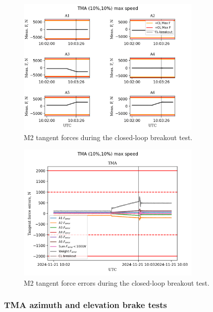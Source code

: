 \begin{figure}
    \centering
    \includegraphics[width=0.8\textwidth]{spa/M2_cl_breakout_10_tangent_forces.png}
    \caption{M2 tangent forces during the closed-loop breakout test.}
    \label{fig:m2_closed_loop_breakout_tangent_force}
    \end{figure}

\begin{figure}
    \centering
    \includegraphics[width=0.8\textwidth]{spa/M2_cl_breakout_10_tangent_force_errors.png}
    \caption{M2 tangent force errors during the closed-loop breakout test.}
    \label{fig:m2_closed_loop_breakout_tangent_force_errors}
    \end{figure}


\subsubsection{TMA azimuth and elevation brake tests}
\label{subsubsec:tma_azimuth_and_elevation_brake_tests}

